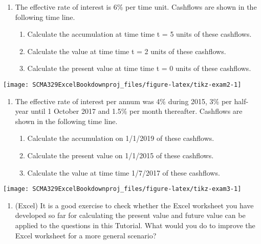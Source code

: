 \documentclass[
]{article}
\providecommand{\tightlist}{%
  \setlength{\itemsep}{0pt}\setlength{\parskip}{0pt}}
\theoremstyle{definition}
\theoremstyle{definition}
\theoremstyle{definition}
\theoremstyle{definition}
\theoremstyle{remark}
\begin{document}
\begin{enumerate}
\def\labelenumi{\arabic{enumi}.}
\setcounter{enumi}{2}
\item
  The effective rate of interest is 6\% per time unit. Cashflows are
  shown in the following time line.

  \begin{enumerate}
  \def\labelenumii{\arabic{enumii}.}
  \item
    Calculate the accumulation at time time t = 5 units of these
    cashflows.
  \item
    Calculate the value at time time t = 2 units of these cashflows.
  \item
    Calculate the present value at time time t = 0 units of these
    cashflows.
  \end{enumerate}
\end{enumerate}

\begin{center}\texttt{[image: SCMA329ExcelBookdownproj\_files/figure-latex/tikz-exam2-1]} \end{center}

\begin{enumerate}
\def\labelenumi{\arabic{enumi}.}
\setcounter{enumi}{3}
\item
  The effective rate of interest per annum was 4\% during 2015, 3\% per
  half-year until 1 October 2017 and 1.5\% per month thereafter.
  Cashflows are shown in the following time line.

  \begin{enumerate}
  \def\labelenumii{\arabic{enumii}.}
  \item
    Calculate the accumulation on 1/1/2019 of these cashflows.
  \item
    Calculate the present value on 1/1/2015 of these cashflows.
  \item
    Calculate the value at time time 1/7/2017 of these cashflows.
  \end{enumerate}
\end{enumerate}

\begin{center}\texttt{[image: SCMA329ExcelBookdownproj\_files/figure-latex/tikz-exam3-1]} \end{center}

\begin{enumerate}
\def\labelenumi{\arabic{enumi}.}
\setcounter{enumi}{4}
\tightlist
\item
  (Excel) It is a good exercise to check whether the Excel worksheet
  you have developed so far for calculating the present value and
  future value can be applied to the questions in this Tutorial. What
  would you do to improve the Excel worksheet for a more general
  scenario?
\end{enumerate}
\end{document}
